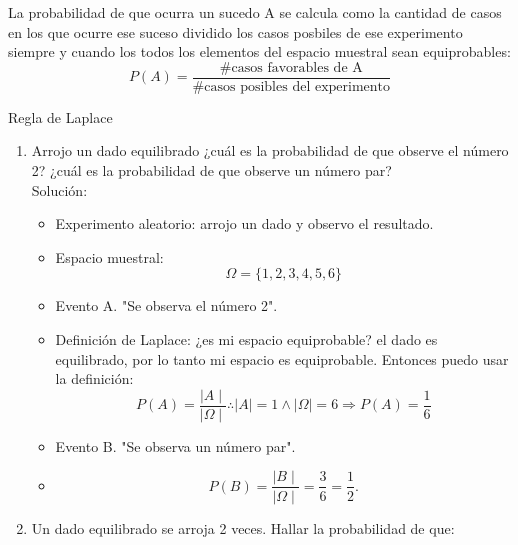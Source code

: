 \documentclass[../main.tex]{subfiles}
\begin{document}
\begin{definition}
    La probabilidad de que ocurra un sucedo A se calcula como la cantidad de casos en los que ocurre ese suceso dividido los casos posbiles de ese experimento siempre y cuando los todos los elementos del espacio muestral sean equiprobables:
    \begin{equation*}
        P(A) = \frac{\#\text{casos favorables de A}}{\#\text{casos posibles del experimento}}
    \end{equation*}
\end{definition}

\begin{defexamples} Regla de Laplace
    \begin{enumerate}
        \item Arrojo un dado equilibrado ¿cuál es la probabilidad de que observe el número 2? ¿cuál es la probabilidad de que observe un número par?\\
        Solución:
        \begin{itemize}
            \item Experimento aleatorio: arrojo un dado y observo el resultado.
            \item Espacio muestral:
                \begin{equation*}
                    \Omega = \{1, 2, 3, 4, 5, 6\}
                \end{equation*}
            \item Evento A. "Se observa el número 2".
            \item Definición de Laplace: ¿es mi espacio equiprobable? el dado es equilibrado, por lo tanto mi espacio es equiprobable. Entonces puedo usar la definición:
                \begin{equation*}
                    P(A) = \frac{\mid A\mid}{\mid\Omega\mid} \therefore \mid A\mid = 1 \wedge \mid\Omega\mid = 6 \Rightarrow P(A) = \frac{1}{6}
                \end{equation*}
            \item Evento B. "Se observa un número par".
            \item 
                \begin{equation*}
                    P(B) = \frac{\mid B\mid}{\mid\Omega\mid} = \frac{3}{6} = \frac{1}{2}.
                \end{equation*}
        \end{itemize}
        \item  Un dado equilibrado se arroja 2 veces. Hallar la probabilidad de que:

\end{enumerate}
\end{defexamples}
\end{document}
